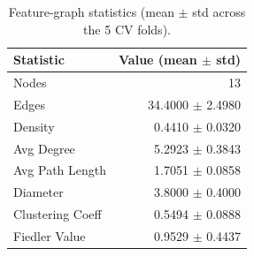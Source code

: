 \begin{table}[t]
\centering
\caption{Feature-graph statistics (mean $\pm$ std across the 5 CV folds).}
\label{tab:graphstats}
\small
\begin{tabular}{lr}
\toprule
Statistic & Value (mean $\pm$ std) \\
\midrule
Nodes & 13 \\
Edges & 34.4000 $\pm$ 2.4980 \\
Density & 0.4410 $\pm$ 0.0320 \\
Avg Degree & 5.2923 $\pm$ 0.3843 \\
Avg Path Length & 1.7051 $\pm$ 0.0858 \\
Diameter & 3.8000 $\pm$ 0.4000 \\
Clustering Coeff & 0.5494 $\pm$ 0.0888 \\
Fiedler Value & 0.9529 $\pm$ 0.4437 \\
\bottomrule
\end{tabular}
\end{table}
